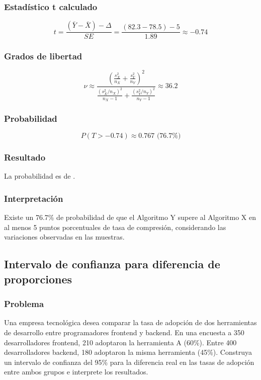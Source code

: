 \subsubsection*{Estadístico t calculado}
\[
t = \frac{(\bar{Y} - \bar{X}) - \Delta}{SE} = \frac{(82.3-78.5)-5}{1.89} \approx -0.74
\]

\subsubsection*{Grados de libertad}
\[
\nu \approx \frac{\left(\frac{s_X^2}{n_X} + \frac{s_Y^2}{n_Y}\right)^2}{\frac{(s_X^2/n_X)^2}{n_X-1} + \frac{(s_Y^2/n_Y)^2}{n_Y-1}} \approx 36.2
\]

\subsubsection*{Probabilidad}
\[
P(T > -0.74) \approx 0.767 \text{ (76.7\%)}
\]

\subsubsection*{Resultado}
La probabilidad es de .

\subsubsection*{Interpretación}
Existe un 76.7\% de probabilidad de que el Algoritmo Y supere al Algoritmo X en al menos 5 puntos porcentuales de tasa de compresión, considerando las variaciones observadas en las muestras.

\subsection{Intervalo de confianza para diferencia de proporciones}

\subsubsection*{Problema}
Una empresa tecnológica desea comparar la tasa de adopción de dos herramientas de desarrollo entre programadores frontend y backend. En una encuesta a 350 desarrolladores frontend, 210 adoptaron la herramienta A (60\%). Entre 400 desarrolladores backend, 180 adoptaron la misma herramienta (45\%). Construya un intervalo de confianza del 95\% para la diferencia real en las tasas de adopción entre ambos grupos e interprete los resultados.

